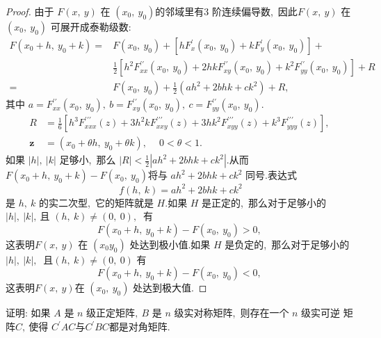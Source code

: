 \begin{proof}
	由于  $F(x,\  y) $ 在  $\left(x_{0},\  y_{0}\right)  $的邻域里有$ 3$ 阶连续偏导数,\  因此$  F(x,\  y)$  在 $ \left(x_{0},\  y_{0}\right) $ 可展开成泰勒级数:
	$$\begin{aligned}
		F\left(x_{0}+h,\  y_{0}+k\right)= & F\left(x_{0},\  y_{0}\right)+\left[h F_{x}^{\prime}\left(x_{0},\  y_{0}\right)+k F_{y}^{\prime}\left(x_{0},\  y_{0}\right)\right]+ \\
		& \frac{1}{2}\left[h^{2} F_{x x}^{\prime \prime}\left(x_{0},\  y_{0}\right)+2 h k F_{x y}^{\prime \prime}\left(x_{0},\  y_{0}\right)+k^{2} F_{y y}^{\prime \prime}\left(x_{0},\  y_{0}\right)\right]+R \\
		= & F\left(x_{0},\  y_{0}\right)+\frac{1}{2}\left(a h^{2}+2 b h k+c k^{2}\right)+R,\ 
	\end{aligned}$$
	其中 $ a=F_{x x}^{\prime \prime}\left(x_{0},\  y_{0}\right),\  b=F_{x y}^{\prime \prime}\left(x_{0},\  y_{0}\right),\  c=F_{y y}^{\prime \prime}\left(x_{0},\  y_{0}\right) .$
	$$\begin{aligned}
		R & =\frac{1}{6}\left[h^{3} F_{x x x}^{\prime \prime \prime}(z)+3 h^{2} k F_{x x y}^{\prime \prime \prime}(z)+3 h k^{2} F_{x y y}^{\prime \prime \prime}(z)+k^{3} F_{y y y}^{\prime \prime \prime}(z)\right],\  \\
		\boldsymbol{z} & =\left(x_{0}+\theta h,\  y_{0}+\theta k\right),\  \quad 0<\theta<1 .
	\end{aligned}$$
	如果  $|h|,\ |k| $ 足够小,\  那么  $|R|<\frac{1}{2}\left|a h^{2}+2 b h k+c k^{2}\right|  .$从而$  F\left(x_{0}+h,\  y_{0}+k\right)-F\left(x_{0},\  y_{0}\right)  $将与 $ a h^{2}+2 b h k+c k^{2}$  同号.表达式
	$$f(h,\  k)=a h^{2}+2 b h k+c k^{2}$$
	是 $ h,\  k$  的实二次型,\  它的矩阵就是 $ H  .$如果  $H $ 是正定的,\  那么对于足够小的$  |h|,\ |k| ,\  $且 $ (h,\  k) \neq(0,\ 0) ,\ $ 有
	$$F\left(x_{0}+h,\  y_{0}+k\right)-F\left(x_{0},\  y_{0}\right)>0,\ $$
	这表明$  F(x,\  y) $ 在 $ \left(x_{0} y_{0}\right)$  处达到极小值.如果  $H$  是负定的,\  那么对于足够小的$  |h|,\ |k| ,\ $ 且$ (h,\  k) \neq(0,\ 0)$  有
	$$F\left(x_{0}+h,\  y_{0}+k\right)-F\left(x_{0},\  y_{0}\right)<0,\ $$
	这表明$  F(x,\  y)  $在  $\left(x_{0},\  y_{0}\right)$  处达到极大值.
\end{proof}
\newpage
\begin{problem}
	证明: 如果 $ A$ 是  $n $ 级正定矩阵$,\   B $ 是  $n$  级实对称矩阵,\  则存在一个  $n $ 级实可逆 矩阵$  C ,\  $使得 $ C^{\prime} A C  与  C^{\prime} B C  $都是对角矩阵.
\end{problem}
